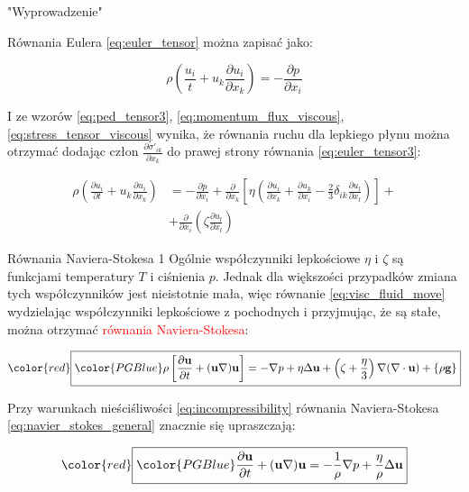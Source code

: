 \documentclass{beamer}
\begin{document}
\begin{frame}{"Wyprowadzenie"}

	Równania Eulera \eqref{eq:euler_tensor} można zapisać jako:

	\begin{equation}
		\rho \left(\frac{u_i}{t} + u_k
		\frac{\partial u_i}{\partial x_k}\right) =
		-\frac{\partial p}{\partial x_i}
	\label{eq:euler_tensor3}
	\end{equation}

	I ze wzorów \eqref{eq:ped_tensor3}, \eqref{eq:momentum_flux_viscous},
	\eqref{eq:stress_tensor_viscous} wynika, że równania
	ruchu dla lepkiego płynu można otrzymać dodając człon
	$\frac{\partial \sigma'_{ik}}{\partial x_k}$ do prawej strony równania
	\eqref{eq:euler_tensor3}:

	\begin{equation}
		\begin{split}
		\rho \left(\frac{\partial u_i}{\partial t} + 
		u_k \frac{\partial u_i}{\partial x_k}\right) & =
		-\frac{\partial p}{\partial x_i} +
		\frac{\partial}{\partial x_k} \left[
			\eta\left(\frac{\partial u_i}{\partial x_k} +
			\frac{\partial u_k}{\partial x_i} - 
			\frac{2}{3}\delta_{ik}\frac{\partial u_l}{\partial x_l}\right)\right] +\\
		& + \frac{\partial}{\partial x_i}\left(\zeta
		\frac{\partial u_l}{\partial x_l}\right)
		\end{split}
		\label{eq:visc_fluid_move}
	\end{equation}
\end{frame}

\begin{frame}{Równania Naviera-Stokesa 1}
	Ogólnie współczynniki lepkościowe $\eta$ i $\zeta$ są funkcjami 
	temperatury $T$ i ciśnienia $p$. Jednak dla większości przypadków
	zmiana tych współczynników jest nieistotnie mała, więc równanie
	\eqref{eq:visc_fluid_move} wydzielając współczynniki 
	lepkościowe z pochodnych i przyjmując, że są stałe, można otrzymać
	\textcolor{red}{równania Naviera-Stokesa}:

	\begin{equation}
		\color{red}\boxed{\color{PGBlue}
		\rho\left[\frac{\partial \textbf{u}}{\partial t} +
		(\textbf{u}\nabla)\textbf{u}\right] = -\nabla p 
		+\eta \Delta \textbf{u} + \left(\zeta + \frac{\eta}{3}\right)
		\nabla (\nabla \cdot \textbf{u}) + \{\rho \textbf{g}\}}
		\label{eq:navier_stokes_general}
	\end{equation}

	Przy warunkach nieściśliwości \eqref{eq:incompressibility} równania
	Naviera-Stokesa \eqref{eq:navier_stokes_general} znacznie się upraszczają:

	\begin{equation}
		\color{red}\boxed{\color{PGBlue}
		\frac{\partial \textbf{u}}{\partial t} +
		(\textbf{u}\nabla)\textbf{u} = -\frac{1}{\rho}\nabla p +
		\frac{\eta}{\rho}\Delta \textbf{u}}
		\label{eq:navier_stokes_incompressible}
	\end{equation}

\end{frame}
\end{document}
